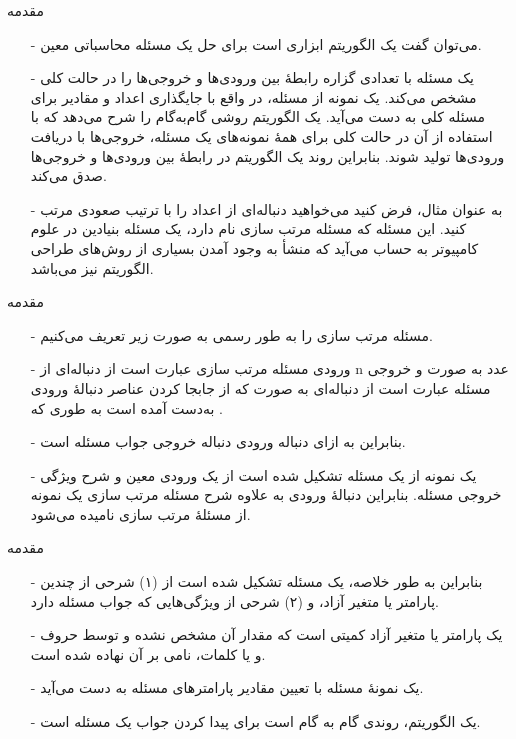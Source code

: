 \begin{frame}{مقدمه}
\begin{itemize}\itemr
\item[-]
می‌توان گفت یک الگوریتم ابزاری است برای حل یک مسئله محاسباتی معین.
\item[-]
یک مسئله با تعدادی گزاره رابطهٔ بین ورودی‌ها و خروجی‌ها را در حالت کلی مشخص می‌کند. یک نمونه از مسئله، در واقع با جایگذاری اعداد و مقادیر برای مسئله کلی به دست می‌آید. یک الگوریتم روشی گام‌به‌گام را شرح می‌دهد که با استفاده از آن در حالت کلی برای همهٔ نمونه‌های یک مسئله، خروجی‌ها با دریافت ورودی‌ها تولید شوند.
بنابراین روند یک الگوریتم در رابطهٔ بین ورودی‌ها و خروجی‌ها صدق می‌کند.
\item[-]
به عنوان مثال، فرض کنید می‌خواهید دنباله‌ای از اعداد را با ترتیب صعودی مرتب کنید. این مسئله که مسئله مرتب سازی
نام دارد، یک مسئله بنیادین در علوم کامپیوتر به حساب می‌آید که منشأ به وجود آمدن بسیاری از روش‌های طراحی الگوریتم نیز می‌باشد.
\end{itemize}
\end{frame}


\begin{frame}{مقدمه}
\begin{itemize}\itemr
\item[-]
مسئله مرتب سازی را به طور رسمی به صورت زیر تعریف می‌کنیم.
\item[-]
ورودی مسئله مرتب سازی عبارت است از دنباله‌ای از n عدد به صورت
و خروجی مسئله عبارت است از دنباله‌ای به صورت
که از جابجا کردن عناصر دنبالهٔ ورودی به‌دست آمده است به طوری که
.
\item[-]
بنابراین به ازای دنباله ورودی
دنباله خروجی
جواب مسئله است.
\item[-]
یک نمونه از یک مسئله
تشکیل شده است از یک ورودی معین و شرح ویژگی خروجی مسئله. بنابراین 
 دنبالهٔ ورودی
  به علاوه شرح مسئله مرتب سازی یک نمونه از مسئلهٔ مرتب سازی نامیده می‌شود.
\end{itemize}
\end{frame}

\begin{frame}{مقدمه}
\begin{itemize}\itmsep{5mm}
\item[-]
بنابراین به طور خلاصه، یک مسئله تشکیل شده است از (۱) شرحی از چندین پارامتر یا متغیر آزاد، و (۲) شرحی از ویژگی‌هایی که جواب مسئله دارد.
\item[-]
یک پارامتر یا متغیر آزاد کمیتی است که مقدار آن مشخص نشده و توسط حروف و یا کلمات، نامی بر آن نهاده شده است.
\item[-]
یک نمونهٔ مسئله با تعیین مقادیر پارامترهای مسئله به دست می‌آید.
\item[-]
یک الگوریتم، روندی گام به گام است برای پیدا کردن جواب یک مسئله است.
\end{itemize}
\end{frame}


